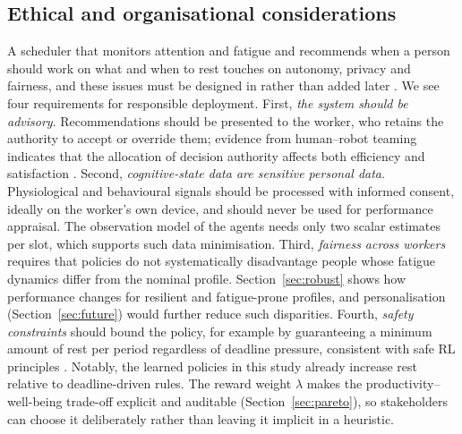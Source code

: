 \subsection{Ethical and organisational considerations}\label{sec:ethics}
A scheduler that monitors attention and fatigue and recommends when a person should work on what and when to rest touches on autonomy, privacy and fairness, and these issues must be designed in rather than added later \cite{parasuraman2000,feigh2012,amodei2016}. We see four requirements for responsible deployment. First, \emph{the system should be advisory}. Recommendations should be presented to the worker, who retains the authority to accept or override them; evidence from human--robot teaming indicates that the allocation of decision authority affects both efficiency and satisfaction \cite{gombolay2015}. Second, \emph{cognitive-state data are sensitive personal data}. Physiological and behavioural signals should be processed with informed consent, ideally on the worker's own device, and should never be used for performance appraisal. The observation model of the agents needs only two scalar estimates per slot, which supports such data minimisation. Third, \emph{fairness across workers} requires that policies do not systematically disadvantage people whose fatigue dynamics differ from the nominal profile. Section~\ref{sec:robust} shows how performance changes for resilient and fatigue-prone profiles, and personalisation (Section~\ref{sec:future}) would further reduce such disparities. Fourth, \emph{safety constraints} should bound the policy, for example by guaranteeing a minimum amount of rest per period regardless of deadline pressure, consistent with safe RL principles \cite{garcia2015}. Notably, the learned policies in this study already increase rest relative to deadline-driven rules. The reward weight $\lambda$ makes the productivity--well-being trade-off explicit and auditable (Section~\ref{sec:pareto}), so stakeholders can choose it deliberately rather than leaving it implicit in a heuristic.

